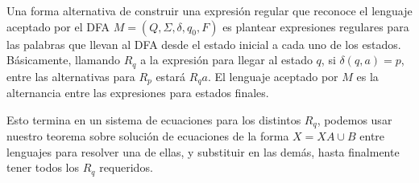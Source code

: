 \documentclass[spanish, fleqn]{article}
\title{Informática Teórica\\
       Tarea \#\num \\
       ``Esto no se compila''}
\author{Andrés Navarro // 201673001-K}
\date{25 de septiembre de 2017}
\begin{document}
\maketitle
\pagestyle{empty}
\thispagestyle{empty}

  Una forma alternativa de construir una expresión regular
  que reconoce el lenguaje aceptado
  por el DFA \(M = (Q, \Sigma, \delta, q_0, F)\)
  es plantear expresiones regulares
  para las palabras que llevan al DFA desde el estado inicial
  a cada uno de los estados.
  Básicamente,
  llamando \(R_q\) a la expresión para llegar al estado \(q\),
  si \(\delta(q, a) = p\),
  entre las alternativas para \(R_p\) estará \(R_q a\).
  El lenguaje aceptado por \(M\) es la alternancia entre las expresiones
  para estados finales.

  Esto termina en un sistema de ecuaciones para los distintos \(R_q\),
  podemos usar nuestro teorema
  sobre solución de ecuaciones de la forma \(X = X A \cup B\) entre lenguajes
  para resolver una de ellas,
  y substituir en las demás,
  hasta finalmente tener todos los \(R_q\) requeridos.
\end{document}

